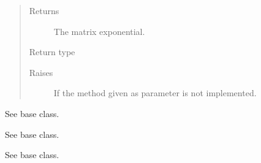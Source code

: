 \documentclass[letterpaper,10pt,english]{sphinxmanual}
\begin{document}
\begin{fulllineitems}
\begin{fulllineitems}
\begin{quote}
\begin{description}
\begin{itemize}
\end{itemize}

\item[{Returns}] \leavevmode
{} \textendash{} The matrix exponential.

\item[{Return type}] \leavevmode
{\hyperref[\detokenize{qsim:qsim.matrix.DenseOperator}]{}}

\item[{Raises}] \leavevmode
{} \textendash{} If the method given as parameter is not implemented.

\end{description}\end{quote}

\end{fulllineitems}


\begin{fulllineitems}
\label{\detokenize{qsim:qsim.matrix.DenseOperator.flatten}}
See base class.

\end{fulllineitems}


\begin{fulllineitems}
\label{\detokenize{qsim:qsim.matrix.DenseOperator.identity_like}}
See base class.

\end{fulllineitems}


\begin{fulllineitems}
\label{\detokenize{qsim:qsim.matrix.DenseOperator.kron}}
See base class.

\end{fulllineitems}


\end{fulllineitems}
\end{document}
